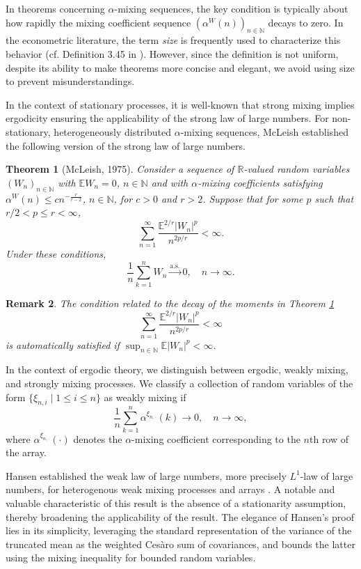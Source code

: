 \documentclass[a4paper,10pt]{article}
\newtheorem{theorem}{Theorem}[section]
\newtheorem{remark}[theorem]{Remark}
\newcommand{\N}{\mathbb{N}}
\newcommand{\R}{\mathbb{R}}
\newcommand{\E}{\mathbb{E}}
\newcommand{\Pas}{\text{a.s.}}
\begin{document}
In theorems concerning $\alpha$-mixing sequences, the key condition is typically about how rapidly the mixing coefficient sequence $(\alpha^W(n))_{n\in\N}$ decays to zero. In the econometric literature, the term \emph{size} is frequently used to characterize this behavior (cf. Definition 3.45 in \cite{white2000}). However, since the definition is not uniform, despite its ability to make theorems more concise and elegant, we avoid using size to prevent misunderstandings.


In the context of stationary processes, it is well-known that strong mixing implies ergodicity ensuring the applicability of the strong law of large numbers. 
For non-stationary, heterogeneously distributed $\alpha$-mixing sequences, McLeish \cite{McLeish} established the following version of the strong law of large numbers.
\begin{theorem}[McLeish, 1975]\label{thm:McLeish}
	Consider a sequence of $\R$-valued  random variables $(W_n)_{n\in\N}$ with $\E W_n=0$, $n\in\N$ and with $\alpha$-mixing coefficients satisfying
	$\alpha^W (n)\le c n^{-\frac{r}{r-2}}$, $n\in\N$,
	for $c>0$ and $r>2$. Suppose that for some $p$ such that $r/2<p\le r<\infty$,
	$$
	\sum_{n=1}^\infty \frac{\E^{2/r} |W_n|^p}{n^{2p/r}}<\infty.
	$$
	Under these conditions,
	$$
	\frac{1}{n}\sum_{k=1}^n W_n\stackrel{\Pas}{\to} 0,\quad n\to\infty.
	$$
\end{theorem}
\begin{remark}\label{rem:McLeish}
	The condition related to the decay of the moments in Theorem \ref{thm:McLeish}
	$$
	\sum_{n=1}^\infty \frac{\E^{2/r} |W_n|^p}{n^{2p/r}} < \infty
	$$
	is automatically satisfied if $\sup_{n \in \N} \E |W_n|^p < \infty$.
\end{remark}

In the context of ergodic theory, we distinguish between ergodic, weakly mixing, and strongly mixing processes. 
We classify a collection of random variables of the form 
$\{\xi_{n,i} \mid 1 \le i \le n\}$ as weakly mixing if
$$
\frac{1}{n} \sum_{k=1}^{n} \alpha^{\xi_{n, \cdot}}(k) \to 0, \quad n \to \infty,
$$
where $\alpha^{\xi_{n, \cdot}}(\cdot)$ denotes the $\alpha$-mixing coefficient corresponding to the $n$th row of the array.

Hansen established the weak law of large numbers, more precisely $L^1$-law of large numbers, for heterogenous weak mixing processes and arrays \cite{hansen2019weak}. A notable and valuable characteristic of this result is the absence of a stationarity assumption, thereby broadening the applicability of the result. The elegance of Hansen's proof lies in its simplicity, leveraging the standard representation of the variance of the truncated mean as the weighted Ces\`{a}ro sum of covariances, and bounds the latter using the mixing inequality for bounded random variables. 
\end{document}
